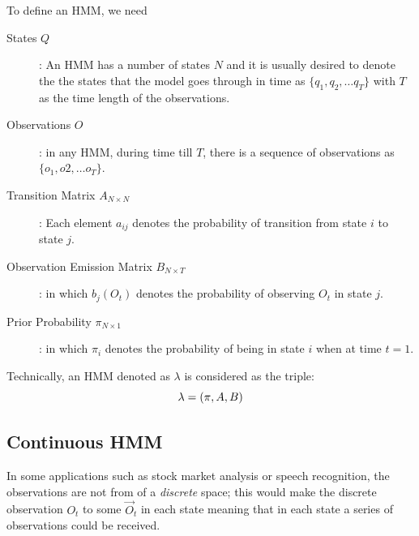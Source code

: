 \documentclass{acm_proc_article-sp}
\begin{document}
To define an HMM, we need
\begin{description}
\item[States $Q$]: An HMM has a number of states $N$ and it is usually desired to denote the the states that the model
goes through in time as $\{q_1, q_2, \ldots q_T\}$ with $T$ as the time length of the observations.
\item[Observations $O$]: in any HMM, during time till $T$, there is a sequence of observations as $\{o_1, o2, \ldots
o_T\}$.
\item[Transition Matrix $A_{N \times N}$]: Each element $a_{ij}$ denotes the probability of transition from state $i$
to state $j$.
\item[Observation Emission Matrix $B_{N \times T}$]: in which $b_j(O_t)$ denotes the probability of observing $O_t$ in
state $j$.
\item[Prior Probability $\pi_{N \times 1}$]: in which $\pi_i$ denotes the probability of being in state $i$ when at
time $t = 1$.
\end{description}
Technically, an HMM denoted as $\lambda$ is considered as the triple:
\begin{equation}
\boldmath{\lambda = (\pi, A, B)}
\end{equation} 

\subsection{Continuous HMM}
In some applications such as stock market analysis or speech recognition, the observations are not from of a
\textit{discrete} space; this would make the discrete observation $O_t$ to some $\vec{O}_t$ in each state meaning that
in each state a series of observations could be received.
\end{document}
